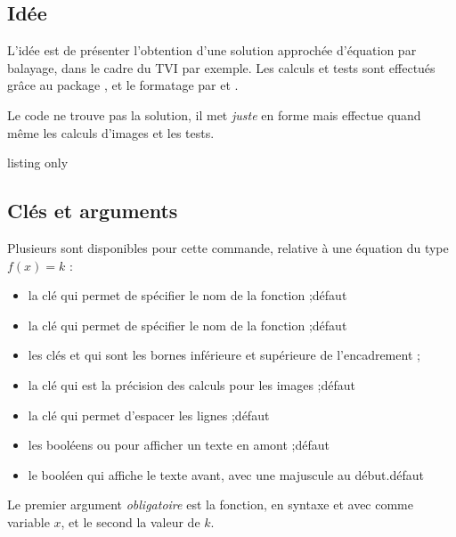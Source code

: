\subsection{Idée}

\begin{tipblock}
 L'idée est de présenter l'obtention d'une solution approchée d'équation par balayage, dans le cadre du TVI par exemple. Les calculs et tests sont effectués grâce au package , et le formatage par  et .
\end{tipblock}

\begin{warningblock}
Le code ne trouve pas la solution, il met \textit{juste} en forme mais effectue quand même les calculs d'images et les tests.
\end{warningblock}

\begin{PresCodeTexPL}{listing only}
\end{PresCodeTexPL}

\subsection{Clés et arguments}

\begin{cautionblock}
Plusieurs  sont disponibles pour cette commande, relative à une équation du type $f(x)=k$ :

\begin{itemize}
	\item la clé  qui permet de spécifier le nom de la fonction ;\hfill{}défaut 
	\item la clé  qui permet de spécifier le nom de la fonction ;\hfill{}défaut 
	\item les clés  et  qui sont les bornes inférieure et supérieure de l'encadrement ;
	\item la clé  qui est la précision des calculs pour les images ;\hfill{}défaut 
	\item la clé  qui permet d'espacer les lignes ;\hfill{}défaut 
	\item les booléens  ou  pour afficher un texte en amont ;\hfill{}défaut 
	\item le booléen  qui affiche le texte avant, avec une majuscule au début.\hfill{}défaut 
\end{itemize}

\smallskip

Le premier argument \textit{obligatoire} est la fonction, en syntaxe  et avec comme variable $x$, et le second la valeur de $k$.
\end{cautionblock}

